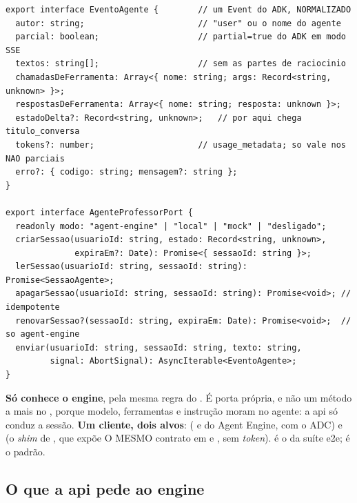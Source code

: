 \begin{lstlisting}[language=tsunoo, caption={\arq{apps/api/src/ai/agente-professor.port.ts} --- a segunda porta de \arq{src/ai} (abreviado)}, label={lst:agenteport}]
export interface EventoAgente {        // um Event do ADK, NORMALIZADO
  autor: string;                       // "user" ou o nome do agente
  parcial: boolean;                    // partial=true do ADK em modo SSE
  textos: string[];                    // sem as partes de raciocinio
  chamadasDeFerramenta: Array<{ nome: string; args: Record<string, unknown> }>;
  respostasDeFerramenta: Array<{ nome: string; resposta: unknown }>;
  estadoDelta?: Record<string, unknown>;   // por aqui chega titulo_conversa
  tokens?: number;                     // usage_metadata; so vale nos NAO parciais
  erro?: { codigo: string; mensagem?: string };
}

export interface AgenteProfessorPort {
  readonly modo: "agent-engine" | "local" | "mock" | "desligado";
  criarSessao(usuarioId: string, estado: Record<string, unknown>,
              expiraEm?: Date): Promise<{ sessaoId: string }>;
  lerSessao(usuarioId: string, sessaoId: string): Promise<SessaoAgente>;
  apagarSessao(usuarioId: string, sessaoId: string): Promise<void>; // idempotente
  renovarSessao?(sessaoId: string, expiraEm: Date): Promise<void>;  // so agent-engine
  enviar(usuarioId: string, sessaoId: string, texto: string,
         signal: AbortSignal): AsyncIterable<EventoAgente>;
}
\end{lstlisting}

\begin{regra}
\textbf{Só  conhece o engine}, pela mesma regra do
. É porta própria, e não um método a mais no ,
porque modelo, ferramentas e instrução moram no agente: a api só conduz a
sessão. \textbf{Um cliente, dois alvos}:  ( e
 do Agent Engine, com o ADC) e  (o
\emph{shim} de , que expõe O MESMO contrato em
 e , sem
\emph{token}).  é o da suíte e2e;  é o padrão.
\end{regra}

\subsection{O que a api pede ao engine}

